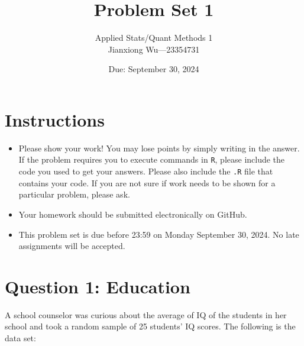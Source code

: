 \documentclass[12pt,letterpaper]{article}
\title{Problem Set 1}
\date{Due: September 30, 2024}
\author{Applied Stats/Quant Methods 1
\\ Jianxiong Wu---23354731}
\begin{document}
	\maketitle
	
	\section*{Instructions}
	\begin{itemize}
	\item Please show your work! You may lose points by simply writing in the answer. If the problem requires you to execute commands in \texttt{R}, please include the code you used to get your answers. Please also include the \texttt{.R} file that contains your code. If you are not sure if work needs to be shown for a particular problem, please ask.
\item Your homework should be submitted electronically on GitHub.
\item This problem set is due before 23:59 on Monday September 30, 2024. No late assignments will be accepted.
	\end{itemize}
	
	\vspace{1cm}
	\section*{Question 1: Education}

A school counselor was curious about the average of IQ of the students in her school and took a random sample of 25 students' IQ scores. The following is the data set:\\
\vspace{.5cm}

  

\vspace{1cm}
\end{document}
